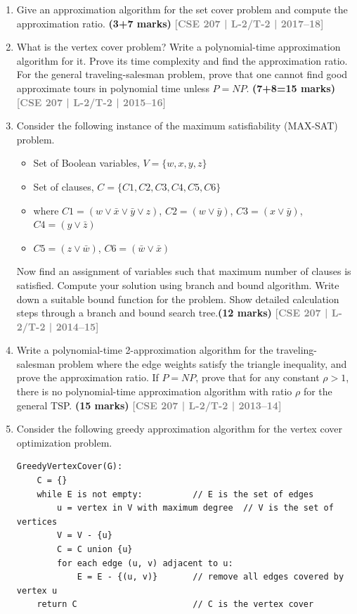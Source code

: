 \documentclass[12pt]{article}
\newcommand{\yr}[1]{\hfill\textcolor{gray}{\small\textbf{[#1]}}}
\newcommand{\mk}[1]{\textcolor{orange!70!black}{\small\textbf{(#1 marks)}}}
\begin{document}
\begin{enumerate}
\item Give an approximation algorithm for the set cover problem and compute the approximation ratio. \mk{3+7}
\yr{CSE 207 | L-2/T-2 | 2017--18}


\item What is the vertex cover problem? Write a polynomial-time approximation algorithm for it. Prove its time complexity and find the approximation ratio. For the general traveling-salesman problem, prove that one cannot find good approximate tours in polynomial time unless $P = NP$. \mk{7+8=15}
\yr{CSE 207 | L-2/T-2 | 2015--16}


\item Consider the following instance of the maximum satisfiability (MAX-SAT) problem.

\begin{itemize}
    \item[] Set of Boolean variables, $V = \{w, x, y, z\}$
    \item[] Set of clauses, $C = \{C1, C2, C3, C4, C5, C6\}$
    \item[] where $C1 = (w \vee \bar{x} \vee \bar{y} \vee z)$, \quad
            $C2 = (w \vee \bar{y})$, \quad
            $C3 = (x \vee \bar{y})$, \quad
            $C4 = (y \vee \bar{z})$
    \item[] $C5 = (z \vee \bar{w})$, \quad
            $C6 = (\bar{w} \vee \bar{x})$
\end{itemize}

\noindent
Now find an assignment of variables such that maximum number of clauses is satisfied.
Compute your solution using branch and bound algorithm. Write down a suitable bound
function for the problem. Show detailed calculation steps through a branch and bound
search tree.\mk{12}
\yr{CSE 207 | L-2/T-2 | 2014--15}


\item Write a polynomial-time 2-approximation algorithm for the traveling-salesman problem where the edge weights satisfy the triangle inequality, and prove the approximation ratio. If $P = NP$, prove that for any constant $\rho > 1$, there is no polynomial-time approximation algorithm with ratio $\rho$ for the general TSP. \mk{15}
\yr{CSE 207 | L-2/T-2 | 2013--14}


\item Consider the following greedy approximation algorithm for the vertex cover optimization problem.

\begin{lstlisting}
GreedyVertexCover(G):
    C = {}
    while E is not empty:          // E is the set of edges
        u = vertex in V with maximum degree  // V is the set of vertices
        V = V - {u}
        C = C union {u}
        for each edge (u, v) adjacent to u:
            E = E - {(u, v)}       // remove all edges covered by vertex u
    return C                       // C is the vertex cover
\end{lstlisting}


\end{enumerate}
\end{document}
